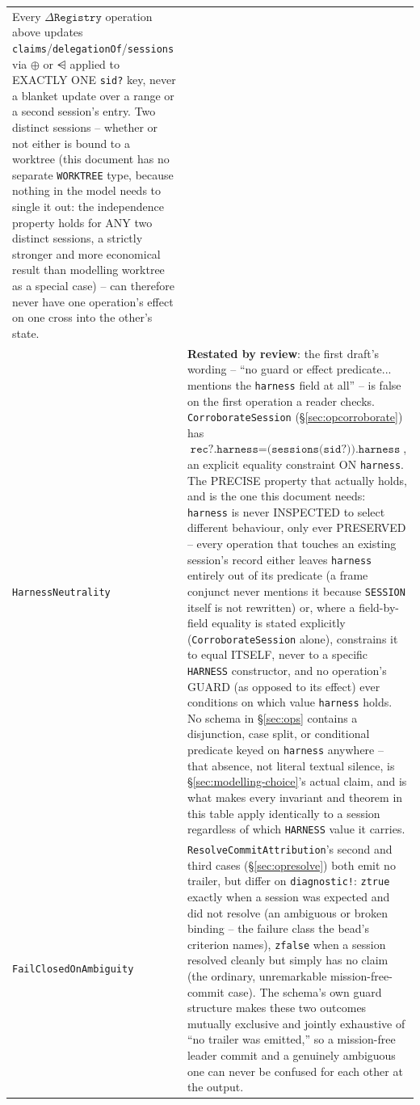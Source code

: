 \documentclass[a4paper,10pt,fleqn]{article}
\newcommand{\field}[1]{\texttt{#1}}
\begin{document}
\begin{center}
\begin{tabularx}{\textwidth}{@{}lX@{}}
  Every $\Delta \field{Registry}$ operation above updates
  \field{claims}/\field{delegationOf}/\field{sessions} via
  $\oplus$ or $\ndres$ applied to EXACTLY ONE \field{sid?}
  key, never a blanket update over a range or a second session's
  entry. Two distinct sessions -- whether or not either is bound to a
  worktree (this document has no separate \field{WORKTREE} type,
  because nothing in the model needs to single it out: the
  independence property holds for ANY two distinct sessions, a strictly
  stronger and more economical result than modelling worktree as a
  special case) -- can therefore never have one operation's effect on
  one cross into the other's state. \\
\field{HarnessNeutrality} &
  \textbf{Restated by review}: the first draft's wording -- ``no guard
  or effect predicate... mentions the \field{harness} field at all'' --
  is false on the first operation a reader checks.
  \field{CorroborateSession} (\S\ref{sec:opcorroborate}) has
  $\field{rec?.harness} = \field{(sessions(sid?)).harness}$, an explicit
  equality constraint ON \field{harness}. The PRECISE property that
  actually holds, and is the one this document needs: \field{harness}
  is never INSPECTED to select different behaviour, only ever PRESERVED
  -- every operation that touches an existing session's record either
  leaves \field{harness} entirely out of its predicate (a frame
  conjunct never mentions it because \field{SESSION} itself is not
  rewritten) or, where a field-by-field equality is stated explicitly
  (\field{CorroborateSession} alone), constrains it to equal ITSELF,
  never to a specific \field{HARNESS} constructor, and no operation's
  GUARD (as opposed to its effect) ever conditions on which value
  \field{harness} holds. No schema in \S\ref{sec:ops} contains a
  disjunction, case split, or conditional predicate keyed on
  \field{harness} anywhere -- that absence, not literal textual
  silence, is \S\ref{sec:modelling-choice}'s actual claim, and is what
  makes every invariant and theorem in this table apply identically to
  a session regardless of which \field{HARNESS} value it carries. \\
\field{FailClosedOnAmbiguity} &
  \field{ResolveCommitAttribution}'s second and third cases
  (\S\ref{sec:opresolve}) both emit no trailer, but differ on
  \field{diagnostic!}: \field{ztrue} exactly when a session was
  expected and did not resolve (an ambiguous or broken binding -- the
  failure class the bead's criterion names), \field{zfalse} when a
  session resolved cleanly but simply has no claim (the ordinary,
  unremarkable mission-free-commit case). The schema's own guard
  structure makes these two outcomes mutually exclusive and jointly
  exhaustive of ``no trailer was emitted,'' so a mission-free leader
  commit and a genuinely ambiguous one can never be confused for each
  other at the output. \\
\bottomrule
\end{tabularx}
\end{center}
\end{document}
